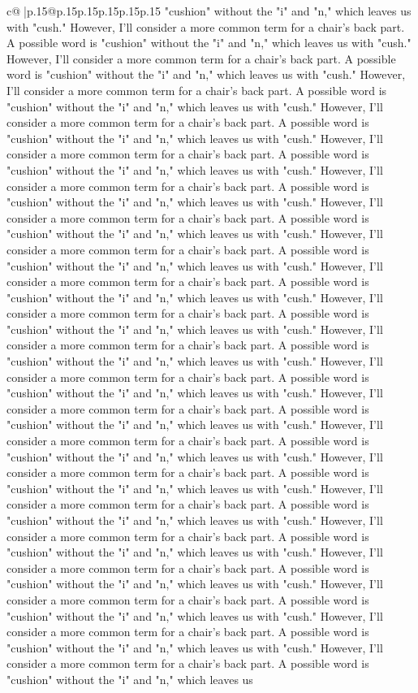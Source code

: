 \documentclass{article}
\begin{document}
{\begin{supertabular}{c@{$\;$}|p{.15\linewidth}@{}p{.15\linewidth}p{.15\linewidth}p{.15\linewidth}p{.15\linewidth}p{.15\linewidth}}
{{{"cushion" without the "i" and "n," which leaves us with "cush." However, I'll consider a more common term for a chair's back part. A possible word is "cushion" without the "i" and "n," which leaves us with "cush." However, I'll consider a more common term for a chair's back part. A possible word is "cushion" without the "i" and "n," which leaves us with "cush." However, I'll consider a more common term for a chair's back part. A possible word is "cushion" without the "i" and "n," which leaves us with "cush." However, I'll consider a more common term for a chair's back part. A possible word is "cushion" without the "i" and "n," which leaves us with "cush." However, I'll consider a more common term for a chair's back part. A possible word is "cushion" without the "i" and "n," which leaves us with "cush." However, I'll consider a more common term for a chair's back part. A possible word is "cushion" without the "i" and "n," which leaves us with "cush." However, I'll consider a more common term for a chair's back part. A possible word is "cushion" without the "i" and "n," which leaves us with "cush." However, I'll consider a more common term for a chair's back part. A possible word is "cushion" without the "i" and "n," which leaves us with "cush." However, I'll consider a more common term for a chair's back part. A possible word is "cushion" without the "i" and "n," which leaves us with "cush." However, I'll consider a more common term for a chair's back part. A possible word is "cushion" without the "i" and "n," which leaves us with "cush." However, I'll consider a more common term for a chair's back part. A possible word is "cushion" without the "i" and "n," which leaves us with "cush." However, I'll consider a more common term for a chair's back part. A possible word is "cushion" without the "i" and "n," which leaves us with "cush." However, I'll consider a more common term for a chair's back part. A possible word is "cushion" without the "i" and "n," which leaves us with "cush." However, I'll consider a more common term for a chair's back part. A possible word is "cushion" without the "i" and "n," which leaves us with "cush." However, I'll consider a more common term for a chair's back part. A possible word is "cushion" without the "i" and "n," which leaves us with "cush." However, I'll consider a more common term for a chair's back part. A possible word is "cushion" without the "i" and "n," which leaves us with "cush." However, I'll consider a more common term for a chair's back part. A possible word is "cushion" without the "i" and "n," which leaves us with "cush." However, I'll consider a more common term for a chair's back part. A possible word is "cushion" without the "i" and "n," which leaves us with "cush." However, I'll consider a more common term for a chair's back part. A possible word is "cushion" without the "i" and "n," which leaves us with "cush." However, I'll consider a more common term for a chair's back part. A possible word is "cushion" without the "i" and "n," which leaves us with "cush." However, I'll consider a more common term for a chair's back part. A possible word is "cushion" without the "i" and "n," which leaves us }}}
\end{supertabular}}
\end{document}
